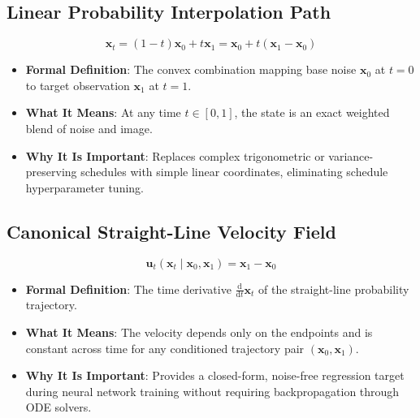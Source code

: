 \documentclass[11pt,a4paper]{article}
\theoremstyle{definition}
\begin{document}
\subsection{Linear Probability Interpolation Path}
{\boldmath
\begin{equation}
\mathbf{x}_t = (1 - t)\mathbf{x}_0 + t \mathbf{x}_1 = \mathbf{x}_0 + t(\mathbf{x}_1 - \mathbf{x}_0)
\end{equation}
}
\begin{itemize}
    \item \textbf{Formal Definition}: The convex combination mapping base noise $\mathbf{x}_0$ at $t = 0$ to target observation $\mathbf{x}_1$ at $t = 1$.
    \item \textbf{What It Means}: At any time $t \in [0, 1]$, the state is an exact weighted blend of noise and image.
    \item \textbf{Why It Is Important}: Replaces complex trigonometric or variance-preserving schedules with simple linear coordinates, eliminating schedule hyperparameter tuning.
\end{itemize}

\subsection{Canonical Straight-Line Velocity Field}
{\boldmath
\begin{equation}
\mathbf{u}_t(\mathbf{x}_t \mid \mathbf{x}_0, \mathbf{x}_1) = \mathbf{x}_1 - \mathbf{x}_0
\end{equation}
}
\begin{itemize}
    \item \textbf{Formal Definition}: The time derivative $\frac{\mathrm{d}}{\mathrm{d}t}\mathbf{x}_t$ of the straight-line probability trajectory.
    \item \textbf{What It Means}: The velocity depends only on the endpoints and is constant across time for any conditioned trajectory pair $(\mathbf{x}_0, \mathbf{x}_1)$.
    \item \textbf{Why It Is Important}: Provides a closed-form, noise-free regression target during neural network training without requiring backpropagation through ODE solvers.
\end{itemize}
\end{document}
